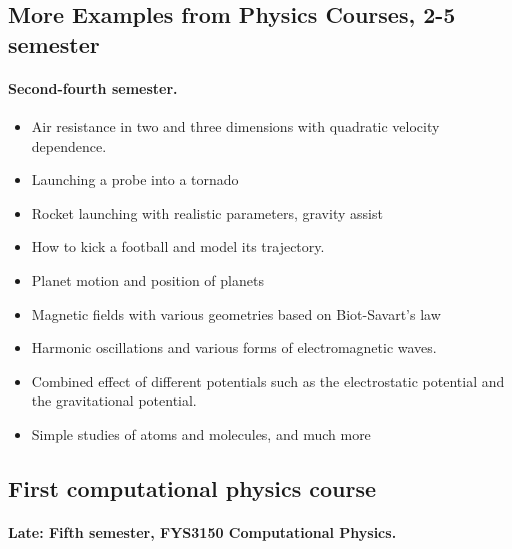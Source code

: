 \documentclass[%
twoside,                 %
final,                   %
10pt]{article}
\begin{document}
\subsection{More Examples from Physics Courses, 2-5 semester}

\paragraph{Second-fourth semester.}

\begin{itemize}
\item Air resistance in two and three dimensions with quadratic velocity dependence.

\item Launching a probe into a tornado

\item Rocket launching with realistic parameters, gravity assist

\item How to kick a football and model its trajectory.

\item Planet motion and position of planets

\item Magnetic fields with various geometries based on Biot-Savart's law

\item Harmonic oscillations and various forms of electromagnetic waves.

\item Combined effect of different potentials such as the electrostatic potential and the gravitational potential.

\item Simple studies of atoms and molecules, and much more
\end{itemize}

\noindent



\subsection{First computational physics course}

\paragraph{Late: Fifth semester, FYS3150 Computational Physics.}
\end{document}
